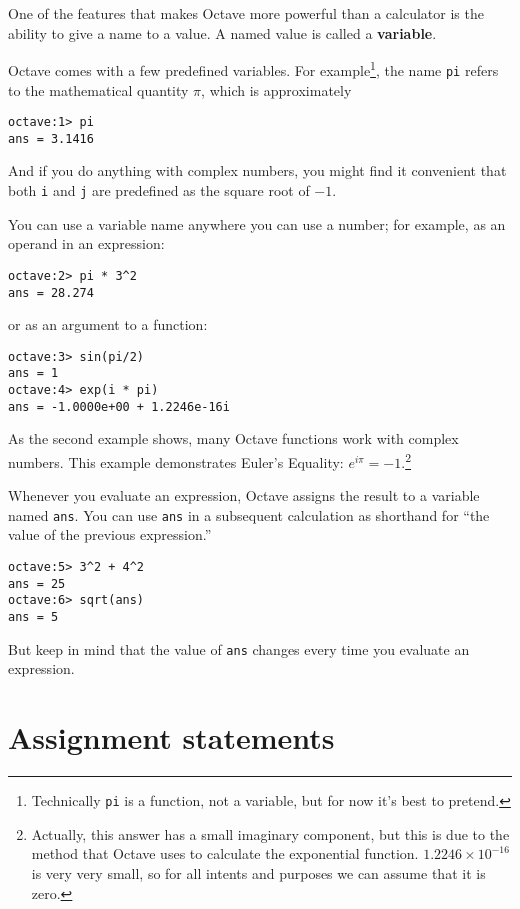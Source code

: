 One of the features that makes Octave more powerful than a calculator
is the ability to give a name to a value. A named value is called
a {\bf variable}.

Octave comes with a few predefined variables. For
example\footnote{Technically {\tt pi} is a function, not a variable,
but for now it's best to pretend.}, the name {\tt pi} refers to the
mathematical quantity $\pi$, which is approximately

\begin{verbatim}
octave:1> pi
ans = 3.1416
\end{verbatim}

And if you do anything with complex numbers, you might find it
convenient that both {\tt i} and {\tt j} are predefined as the square
root of $-1$.

You can use a variable name anywhere you can use a number; for example, as
an operand in an expression:

\begin{verbatim}
octave:2> pi * 3^2
ans = 28.274
\end{verbatim}

or as an argument to a function:

\begin{verbatim}
octave:3> sin(pi/2)
ans = 1
octave:4> exp(i * pi)
ans = -1.0000e+00 + 1.2246e-16i
\end{verbatim}

As the second example shows, many Octave functions work with
complex numbers. This example demonstrates Euler's Equality:
$e^{i \pi} = -1$.\footnote{Actually, this answer has a small imaginary
component, but this is due to the method that Octave uses to calculate the
exponential function. $1.2246 \times 10^{-16}$ is very very small, so for all
intents and purposes we can assume that it is zero.}

Whenever you evaluate an expression, Octave assigns the result to
a variable named {\tt ans}. You can use {\tt ans} in a subsequent
calculation as shorthand for ``the value of the previous expression.''

\begin{verbatim}
octave:5> 3^2 + 4^2
ans = 25
octave:6> sqrt(ans)
ans = 5
\end{verbatim}

But keep in mind that the value of {\tt ans} changes every time
you evaluate an expression.


\section{Assignment statements}

